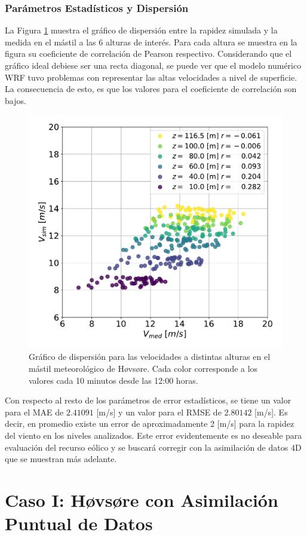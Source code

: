 \subsubsection{Parámetros Estadísticos y Dispersión}
La Figura \ref{fig:06_corr_hov} muestra el gráfico de dispersión entre la rapidez simulada y la medida en el mástil a las 6 alturas de interés. Para cada altura se muestra en la figura su coeficiente de correlación de Pearson respectivo. Considerando que el gráfico ideal debiese ser una recta diagonal, se puede ver que el modelo numérico WRF tuvo problemas con representar las altas velocidades a nivel de superficie. La consecuencia de esto, es que los valores para el coeficiente de correlación son bajos.
\begin{figure}[H]
	\centering
	\includegraphics[width=0.55\linewidth,page=1,trim={0cm 0cm 0cm 0cm},clip]{Imagenes/06/hov/corr}%
	\caption{Gráfico de dispersión para las velocidades a distintas alturas en el mástil meteorológico de Høvsøre. Cada color corresponde a los valores cada 10 minutos desde las 12:00 horas.}
	\label{fig:06_corr_hov}
\end{figure}

Con respecto al resto de los parámetros de error estadísticos, se tiene un valor para el MAE de $2.41091$ [m/s] y un valor para el RMSE de $2.80142$ [m/s]. Es decir, en promedio existe un error de aproximadamente 2 [m/s] para la rapidez del viento en los niveles analizados. Este error evidentemente es no deseable para evaluación del recurso eólico y se buscará corregir con la asimilación de datos 4D que se muestran más adelante.













\newpage
\section{Caso I: Høvsøre con Asimilación Puntual de Datos}
